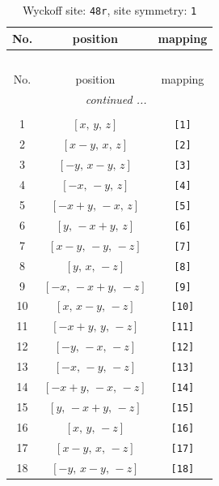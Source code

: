 \documentclass[fleqn,8pt]{jsarticle}
\begin{document}
\begin{longtable}{ccc}
\caption{Wyckoff site: {\tt 48r}, site symmetry: {\tt 1}}
 \\
 \hline \hline
No. & position & mapping \\ \hline \endfirsthead

\multicolumn{2}{l}{\tablename\ \thetable{}} \\
 \hline \hline
No. & position & mapping \\ \hline \endhead

 \hline \hline
\multicolumn{2}{r}{\footnotesize\it continued ...} \\ \endfoot

 \hline \hline
\multicolumn{2}{r}{} \\ \endlastfoot

1 & $\left[ x,\, y,\, z \right]$ & {\tt [1]} \\ \hline
2 & $\left[ x - y,\, x,\, z \right]$ & {\tt [2]} \\ \hline
3 & $\left[ - y,\, x - y,\, z \right]$ & {\tt [3]} \\ \hline
4 & $\left[ - x,\, - y,\, z \right]$ & {\tt [4]} \\ \hline
5 & $\left[ - x + y,\, - x,\, z \right]$ & {\tt [5]} \\ \hline
6 & $\left[ y,\, - x + y,\, z \right]$ & {\tt [6]} \\ \hline
7 & $\left[ x - y,\, - y,\, - z \right]$ & {\tt [7]} \\ \hline
8 & $\left[ y,\, x,\, - z \right]$ & {\tt [8]} \\ \hline
9 & $\left[ - x,\, - x + y,\, - z \right]$ & {\tt [9]} \\ \hline
10 & $\left[ x,\, x - y,\, - z \right]$ & {\tt [10]} \\ \hline
11 & $\left[ - x + y,\, y,\, - z \right]$ & {\tt [11]} \\ \hline
12 & $\left[ - y,\, - x,\, - z \right]$ & {\tt [12]} \\ \hline
13 & $\left[ - x,\, - y,\, - z \right]$ & {\tt [13]} \\ \hline
14 & $\left[ - x + y,\, - x,\, - z \right]$ & {\tt [14]} \\ \hline
15 & $\left[ y,\, - x + y,\, - z \right]$ & {\tt [15]} \\ \hline
16 & $\left[ x,\, y,\, - z \right]$ & {\tt [16]} \\ \hline
17 & $\left[ x - y,\, x,\, - z \right]$ & {\tt [17]} \\ \hline
18 & $\left[ - y,\, x - y,\, - z \right]$ & {\tt [18]} \\ \hline

\end{longtable}
\end{document}
